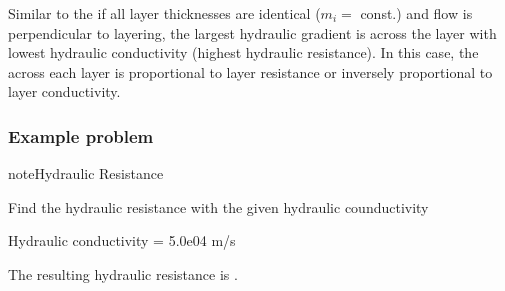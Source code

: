 \documentclass[letterpaper,10pt,english]{sphinxmanual}
\begin{document}
Similar to the  if all layer thicknesses are identical (\(m_i =\) const.) and flow is perpendicular to layering, the largest hydraulic gradient is across the layer with lowest hydraulic conductivity (highest hydraulic resistance). In this case, the  across each layer is proportional to layer resistance or inversely proportional to layer conductivity.


\subsubsection{Example problem}
\label{\detokenize{contents/flow/lecture_05/15_het_iso:id2}}
\begin{sphinxadmonition}{note}{Hydraulic Resistance}

Find the hydraulic resistance with the given hydraulic counductivity
\end{sphinxadmonition}

\begin{sphinxVerbatim}[commandchars=\\\{\}]
\PYG{l+s+s2}{[1m Provided are:}\PYG{l+s+s2}{[0m }

   

  

\PYG{l+s+s2}{[1mSolution:}\PYG{l+s+s2}{[0m}\PYG{l+s+s2}{[1m}\PYG{l+s+s2}{[0m.}
\end{sphinxVerbatim}

\begin{sphinxVerbatim}[commandchars=\\\{\}]

Hydraulic conductivity = 5.0e\PYGZhy{}04 m/s


The resulting hydraulic resistance is .
\end{sphinxVerbatim}
\end{document}
